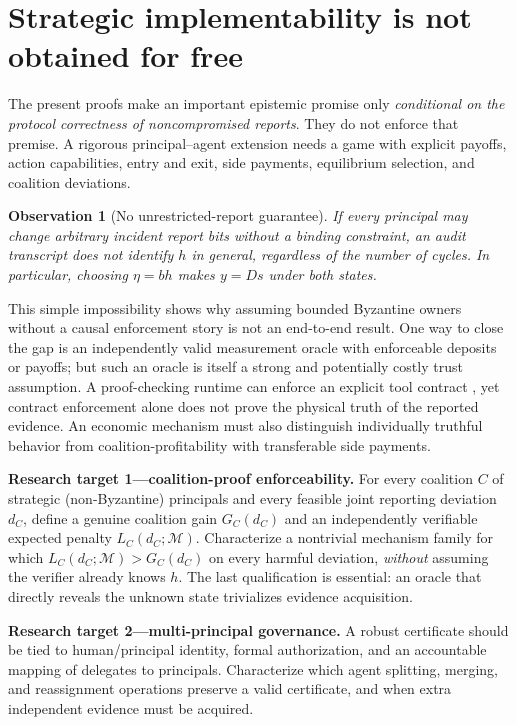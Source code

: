 \documentclass[10pt,a4paper]{article}
\newtheorem{observation}[theorem]{Observation}
\theoremstyle{definition}\newtheorem{definition}[theorem]{Definition}
\begin{document}
\section{Strategic implementability is not obtained for free}
The present proofs make an important epistemic promise only \emph{conditional on the protocol correctness of noncompromised reports}. They do not enforce that premise. A rigorous principal--agent extension needs a game with explicit payoffs, action capabilities, entry and exit, side payments, equilibrium selection, and coalition deviations.

\begin{observation}[No unrestricted-report guarantee]\label{obs:no}
If every principal may change arbitrary incident report bits without a binding constraint, an audit transcript does not identify $h$ in general, regardless of the number of cycles. In particular, choosing $\eta=bh$ makes $y=Ds$ under both states.
\end{observation}
This simple impossibility shows why assuming bounded Byzantine owners without a causal enforcement story is not an end-to-end result. One way to close the gap is an independently valid measurement oracle with enforceable deposits or payoffs; but such an oracle is itself a strong and potentially costly trust assumption. A proof-checking runtime can enforce an explicit tool contract \cite{ciliberto2026}, yet contract enforcement alone does not prove the physical truth of the reported evidence. An economic mechanism must also distinguish individually truthful behavior from coalition-profitability with transferable side payments.

\textbf{Research target 1---coalition-proof enforceability.} For every coalition $C$ of strategic (non-Byzantine) principals and every feasible joint reporting deviation $d_C$, define a genuine coalition gain $G_C(d_C)$ and an independently verifiable expected penalty $L_C(d_C;\mathcal M)$. Characterize a nontrivial mechanism family for which $L_C(d_C;\mathcal M)>G_C(d_C)$ on every harmful deviation, \emph{without} assuming the verifier already knows $h$. The last qualification is essential: an oracle that directly reveals the unknown state trivializes evidence acquisition.

\textbf{Research target 2---multi-principal governance.} A robust certificate should be tied to human/principal identity, formal authorization, and an accountable mapping of delegates to principals. Characterize which agent splitting, merging, and reassignment operations preserve a valid certificate, and when extra independent evidence must be acquired.
\end{document}
